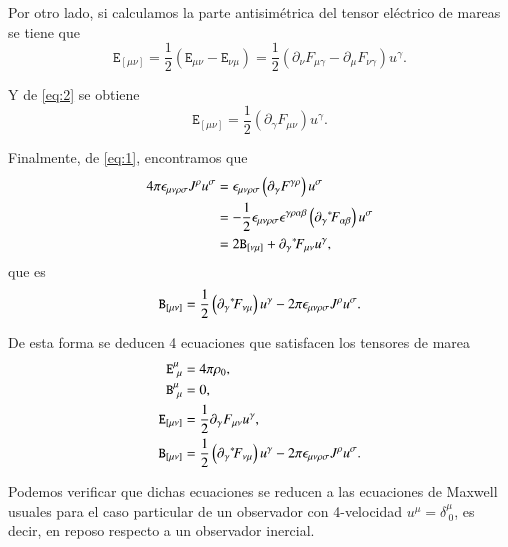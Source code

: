 Por otro lado, si calculamos la parte antisimétrica del tensor eléctrico de mareas se tiene que
\begin{equation}
\mathtt{E}_{[\mu \nu]} = \frac{1}{2} \left( \mathtt{E}_{\mu \nu} - \mathtt{E}_{\nu \mu} \right)
= \frac{1}{2} \left( \partial_{\nu} F_{\mu \gamma} - \partial_{\mu} F_{\nu \gamma} \right) u^{\gamma}.
\end{equation}

Y de \eqref{eq:2} se obtiene
\begin{equation}
\label{eq:55}
\mathtt{E}_{[\mu \nu]} = \frac{1}{2} \left( \partial_{\gamma} F_{\mu \nu} \right) u^{\gamma}.
\end{equation}

Finalmente, de \eqref{eq:1}, encontramos que
\begin{align}
4 \pi \epsilon_{\mu \nu \rho \sigma} J^{\rho} u^{\sigma} 
&= \epsilon_{\mu \nu \rho \sigma} \left( \partial_{\gamma} F^{\gamma \rho} \right) u^{\sigma} \nonumber \\
&= -\frac{1}{2} \epsilon_{\mu \nu \rho \sigma} \epsilon^{\gamma \rho \alpha \beta} \left( \partial_{\gamma} {}^*\! F_{\alpha \beta} \right) u^{\sigma} \nonumber \\
&= 2\mathtt{B}_{[\nu \mu]} + \partial_{\gamma} {}^*\! F_{\mu \nu} u^{\gamma},
\end{align}
que es
\begin{equation}
\mathtt{B}_{[\mu \nu]} = \frac{1}{2} \left( \partial_{\gamma} {}^*\! F_{\nu \mu} \right) u^{\gamma} - 2 \pi \epsilon_{\mu \nu \rho \sigma} J^{\rho} u^{\sigma}.
\end{equation}

De esta forma se deducen 4 ecuaciones que satisfacen los tensores de marea
\begin{align}
\label{eq:maxwell1}
\mathtt{E}^{\mu}_{\ \mu} &= 4 \pi \rho_0,\\
\label{eq:maxwell2}
\mathtt{B}^{\mu}_{\ \mu} &= 0,\\
\label{eq:maxwell3}
\mathtt{E}_{[\mu \nu]} &= \frac{1}{2} \partial_{\gamma} F_{\mu \nu} u^{\gamma},\\
\label{eq:maxwell4}
\mathtt{B}_{[\mu \nu]} &= \frac{1}{2} \left( \partial_{\gamma} {}^*\! F_{\nu \mu} \right) u^{\gamma} - 2 \pi \epsilon_{\mu \nu \rho \sigma} J^{\rho} u^{\sigma}.
\end{align}

Podemos verificar que dichas ecuaciones se reducen a las ecuaciones de Maxwell usuales para el caso particular de un observador con 4-velocidad $u^{\mu} = \delta^{\mu}_{\ 0}$, es decir, en reposo respecto a un observador inercial.

